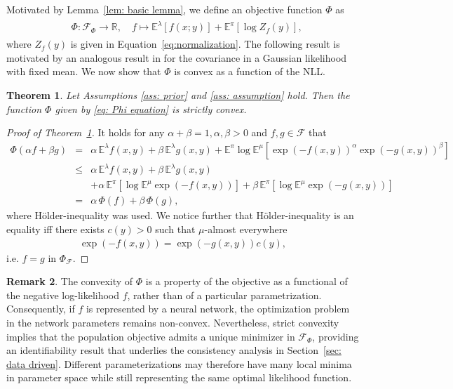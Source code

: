 \documentclass{amsart}
\newtheorem{theorem}{Theorem}[section]
\theoremstyle{definition}
\newtheorem{remark}[theorem]{Remark}
\newcommand{\E}{{\mathbb E}}
\newcommand{\R}{{\mathbb R}}
\newcommand{\F}{\mathcal{F}}
\begin{document}
Motivated by Lemma~\ref{lem: basic lemma}, we define an objective function $\Phi$ as
\begin{eqnarray}
\begin{aligned}\label{eq: Phi equation}
    &  \Phi: \F_\Phi \rightarrow \R,  \quad f \mapsto \E^\lambda [f(x;y)] + \E^\pi [\log Z_f(y)],
\end{aligned}
\end{eqnarray}
where $Z_f(y)$ is given in Equation~\eqref{eq:normalization}.
The following result is motivated by an analogous result in \cite{Helin2025OAE} for the covariance in a Gaussian likelihood with fixed mean. We now show that $\Phi$ is convex as a function of the NLL.
\begin{theorem}\label{thm: convex}
    Let Assumptions  \ref{ass: prior} and \ref{ass: assumption} hold. Then the function $\Phi$ given by \eqref{eq: Phi equation} is strictly convex.
\end{theorem}

\begin{proof}[Proof of Theorem~\ref{thm: convex}]
It holds for any $\alpha + \beta = 1, \alpha, \beta > 0$ and $f, g \in \F$ that
    \begin{eqnarray*}
         \Phi(\alpha f + \beta g) &=& \alpha \, \E^\lambda f(x, y)  + \beta \, \E^\lambda g(x, y)   + \E^\pi \log \E^\mu  \left[\exp \left( -f(x, y)  \right)^\alpha  \exp \left( - g(x, y)  \right)^\beta \right] \\
         & \le & \alpha \, \E^\lambda f(x, y)  + \beta \, \E^\lambda g(x, y)  \\
         & & + \alpha \, \E^\pi \left[\log \E^\mu  \exp \left( -f(x, y)  \right) \right] + \beta \, \E^\pi \left[\log \E^\mu  \exp \left( -g(x, y)  \right) \right]\\ 
         & =& \alpha \, \Phi(f) + \beta \, \Phi(g),
    \end{eqnarray*}
    where Hölder-inequality was used. We notice further that Hölder-inequality is an equality iff there exists $c(y)>0$ such that $\mu$-almost everywhere
    \begin{eqnarray*}
        \exp \left( -f(x, y)\right) = \exp \left( - g(x, y)  \right)c(y),
    \end{eqnarray*}
    i.e. $f = g$ in $\Phi_\F$.
\end{proof}

\begin{remark}
The convexity of $\Phi$ is a property of the objective as a functional of the
negative log-likelihood $f$, rather than of a particular parametrization.
Consequently, if $f$ is represented by a neural network, the optimization
problem in the network parameters remains non-convex. Nevertheless, strict
convexity implies that the population objective admits a unique minimizer in
$\mathcal{F}_\Phi$, providing an identifiability result that underlies the
consistency analysis in Section~\ref{sec: data driven}. Different
parameterizations may therefore have many local minima in parameter space while
still representing the same optimal likelihood function.
\end{remark}
\end{document}
